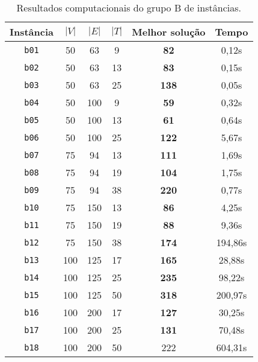 \documentclass{article}
\begin{document}
\begin{table}
    \centering
    \begin{tabular}{c|c|c|c|c|c}
        Instância & $|V|$ & $|E|$ & $|T|$ & Melhor solução & Tempo   \\\hline
        {\tt b01} & 50    & 63    & 9     & {\bf 82}       & 0,12s   \\
        {\tt b02} & 50    & 63    & 13    & {\bf 83}       & 0,15s   \\
        {\tt b03} & 50    & 63    & 25    & {\bf 138}      & 0,05s   \\
        {\tt b04} & 50    & 100   & 9     & {\bf 59}       & 0,32s   \\
        {\tt b05} & 50    & 100   & 13    & {\bf 61}       & 0,64s   \\
        {\tt b06} & 50    & 100   & 25    & {\bf 122}      & 5,67s   \\
        {\tt b07} & 75    & 94    & 13    & {\bf 111}      & 1,69s   \\
        {\tt b08} & 75    & 94    & 19    & {\bf 104}      & 1,75s   \\
        {\tt b09} & 75    & 94    & 38    & {\bf 220}      & 0,77s   \\
        {\tt b10} & 75    & 150   & 13    & {\bf 86}       & 4,25s   \\
        {\tt b11} & 75    & 150   & 19    & {\bf 88}       & 9,36s   \\
        {\tt b12} & 75    & 150   & 38    & {\bf 174}      & 194,86s \\
        {\tt b13} & 100   & 125   & 17    & {\bf 165}      & 28,88s  \\
        {\tt b14} & 100   & 125   & 25    & {\bf 235}      & 98,22s  \\
        {\tt b15} & 100   & 125   & 50    & {\bf 318}      & 200,97s \\
        {\tt b16} & 100   & 200   & 17    & {\bf 127}      & 30,25s  \\
        {\tt b17} & 100   & 200   & 25    & {\bf 131}      & 70,48s  \\
        {\tt b18} & 100   & 200   & 50    & 222            & 604,31s \\
    \end{tabular}
    \caption{Resultados computacionais do grupo B de instâncias.}
    \label{tab:results-b}
\end{table}
\end{document}
